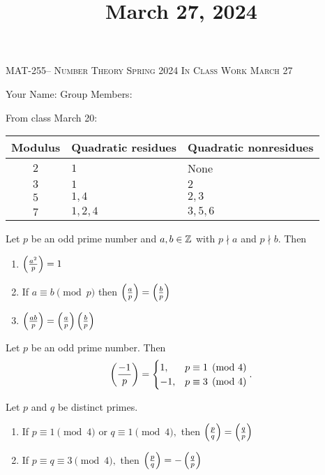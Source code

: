 \documentclass[handout]{ximera}
\title{March 27, 2024}
\begin{document}
\handoutAbstract
\maketitle
 	\begin{center}%
    	{\large \scshape MAT-255-- Number Theory 
			\hfill Spring 2024 
			\hfill In Class Work March 27}%
    
		{\large Your Name: \hrulefill \quad 
			Group Members:\hrulefill \quad 
			\hrulefill
			\par}%
 	\end{center}%
	 
From class March 20:

\begin{tabular}{cll}
	Modulus & Quadratic residues & Quadratic nonresidues\\\hline
	$2$	& $1$ 	& None\\
	$3$	& $1$	& $2$\\
	$5$	& $1,4$	& $2,3$\\
	$7$	& $1,2,4$	& $3,5,6$
\end{tabular}

\begin{prop*}[Proposition 4.5]
	Let $p$ be an odd prime number and $a,b\in\mathbb Z$ with $p\nmid a$ and $p\nmid b.$ Then 
	\begin{enumerate}[label=(\alph*)]
		\item $\left(\frac{a^2}{p}\right)=1$ \label{squares-are-square}
		\item If $a\equiv b\pmod{p}$ then $\left(\frac{a}{p}\right)=\left(\frac{b}{p}\right)$ \label{legendre-respects-mod}
		\item $\left(\frac{ab}{p}\right)=\left(\frac{a}{p}\right)\left(\frac{b}{p}\right)$ \label{legendre-mult}
	\end{enumerate}
\end{prop*}

\begin{thm*}[Theorem 4.6]\label{thm:residue-neg1}
	Let $p$ be an odd prime number. Then 
	\[
		\left(\frac{-1}{p}\right)=
			\begin{cases}
 				1, & p\equiv 1\pmod{4}\\
				-1, & p\equiv 3\pmod{4}
			\end{cases}.
	\]
\end{thm*}

\begin{thm*}\label{quad-rec}
	Let $p$ and $q$ be distinct primes.  
	\begin{enumerate}[label=(\alph*)]
		\item If $p\equiv 1 \pmod{4}$ or $q\equiv 1\pmod{4},$ then $\left(\frac{p}{q}\right)=\left(\frac{q}{p}\right)$
 		\item If $p\equiv q \equiv 3 \pmod{4},$ then $\left(\frac{p}{q}\right)=-\left(\frac{q}{p}\right)$
	\end{enumerate}
\end{thm*}
\end{document}
